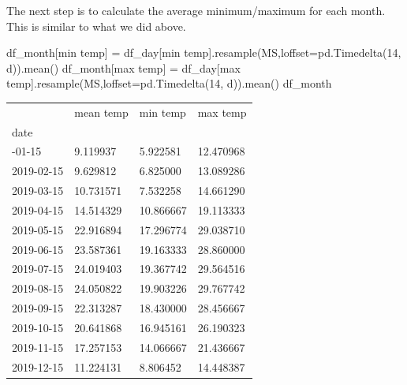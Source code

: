 \documentclass[
  letterpaper,
  DIV=11,
  numbers=noendperiod,
  oneside]{scrreprt}
\newenvironment{Shaded}{\begin{snugshade}}{\end{snugshade}}
\newcommand{\DecValTok}[1]{\textcolor[rgb]{0.68,0.00,0.00}{#1}}
\newcommand{\NormalTok}[1]{\textcolor[rgb]{0.00,0.23,0.31}{#1}}
\newcommand{\OperatorTok}[1]{\textcolor[rgb]{0.37,0.37,0.37}{#1}}
\newcommand{\StringTok}[1]{\textcolor[rgb]{0.13,0.47,0.30}{#1}}
\begin{document}
The next step is to calculate the average minimum/maximum for each
month. This is similar to what we did above.

\begin{Shaded}
\begin{Highlighting}[]
\NormalTok{df\_month[}\StringTok{\textquotesingle{}min temp\textquotesingle{}}\NormalTok{] }\OperatorTok{=}\NormalTok{ df\_day[}\StringTok{\textquotesingle{}min temp\textquotesingle{}}\NormalTok{].resample(}\StringTok{\textquotesingle{}MS\textquotesingle{}}\NormalTok{,loffset}\OperatorTok{=}\NormalTok{pd.Timedelta(}\DecValTok{14}\NormalTok{, }\StringTok{\textquotesingle{}d\textquotesingle{}}\NormalTok{)).mean()}
\NormalTok{df\_month[}\StringTok{\textquotesingle{}max temp\textquotesingle{}}\NormalTok{] }\OperatorTok{=}\NormalTok{ df\_day[}\StringTok{\textquotesingle{}max temp\textquotesingle{}}\NormalTok{].resample(}\StringTok{\textquotesingle{}MS\textquotesingle{}}\NormalTok{,loffset}\OperatorTok{=}\NormalTok{pd.Timedelta(}\DecValTok{14}\NormalTok{, }\StringTok{\textquotesingle{}d\textquotesingle{}}\NormalTok{)).mean()}
\NormalTok{df\_month}
\end{Highlighting}
\end{Shaded}

\begin{longtable}[]{@{}llll@{}}
\toprule\noalign{}
& mean temp & min temp & max temp \\
date & & & \\
\midrule\noalign{}
\endhead
\bottomrule\noalign{}
\endlastfoot
2019-01-15 & 9.119937 & 5.922581 & 12.470968 \\
2019-02-15 & 9.629812 & 6.825000 & 13.089286 \\
2019-03-15 & 10.731571 & 7.532258 & 14.661290 \\
2019-04-15 & 14.514329 & 10.866667 & 19.113333 \\
2019-05-15 & 22.916894 & 17.296774 & 29.038710 \\
2019-06-15 & 23.587361 & 19.163333 & 28.860000 \\
2019-07-15 & 24.019403 & 19.367742 & 29.564516 \\
2019-08-15 & 24.050822 & 19.903226 & 29.767742 \\
2019-09-15 & 22.313287 & 18.430000 & 28.456667 \\
2019-10-15 & 20.641868 & 16.945161 & 26.190323 \\
2019-11-15 & 17.257153 & 14.066667 & 21.436667 \\
2019-12-15 & 11.224131 & 8.806452 & 14.448387 \\
\end{longtable}
\end{document}
